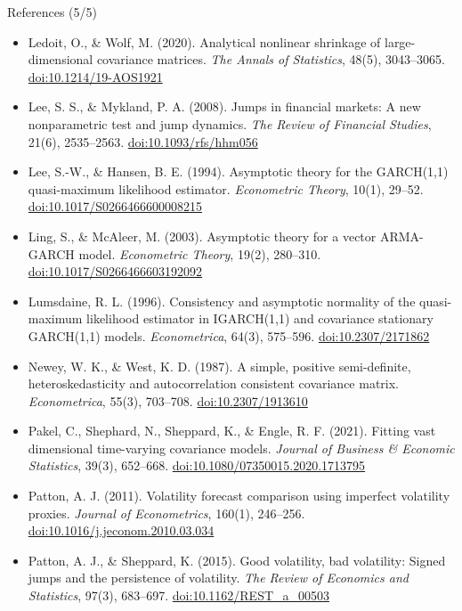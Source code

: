 \begin{frame}{References (5/5)}
\itemsize{\tiny}
\begin{itemize}
    \item Ledoit, O., \& Wolf, M. (2020). Analytical nonlinear shrinkage of large-dimensional covariance matrices. \textit{The Annals of Statistics}, 48(5), 3043--3065. \href{https://doi.org/10.1214/19-AOS1921}{doi:10.1214/19-AOS1921}
    \item Lee, S. S., \& Mykland, P. A. (2008). Jumps in financial markets: A new nonparametric test and jump dynamics. \textit{The Review of Financial Studies}, 21(6), 2535--2563. \href{https://doi.org/10.1093/rfs/hhm056}{doi:10.1093/rfs/hhm056}
    \item Lee, S.-W., \& Hansen, B. E. (1994). Asymptotic theory for the GARCH(1,1) quasi-maximum likelihood estimator. \textit{Econometric Theory}, 10(1), 29--52. \href{https://doi.org/10.1017/S0266466600008215}{doi:10.1017/S0266466600008215}
    \item Ling, S., \& McAleer, M. (2003). Asymptotic theory for a vector ARMA-GARCH model. \textit{Econometric Theory}, 19(2), 280--310. \href{https://doi.org/10.1017/S0266466603192092}{doi:10.1017/S0266466603192092}
    \item Lumsdaine, R. L. (1996). Consistency and asymptotic normality of the quasi-maximum likelihood estimator in IGARCH(1,1) and covariance stationary GARCH(1,1) models. \textit{Econometrica}, 64(3), 575--596. \href{https://doi.org/10.2307/2171862}{doi:10.2307/2171862}
    \item Newey, W. K., \& West, K. D. (1987). A simple, positive semi-definite, heteroskedasticity and autocorrelation consistent covariance matrix. \textit{Econometrica}, 55(3), 703--708. \href{https://doi.org/10.2307/1913610}{doi:10.2307/1913610}
    \item Pakel, C., Shephard, N., Sheppard, K., \& Engle, R. F. (2021). Fitting vast dimensional time-varying covariance models. \textit{Journal of Business \& Economic Statistics}, 39(3), 652--668. \href{https://doi.org/10.1080/07350015.2020.1713795}{doi:10.1080/07350015.2020.1713795}
    \item Patton, A. J. (2011). Volatility forecast comparison using imperfect volatility proxies. \textit{Journal of Econometrics}, 160(1), 246--256. \href{https://doi.org/10.1016/j.jeconom.2010.03.034}{doi:10.1016/j.jeconom.2010.03.034}
    \item Patton, A. J., \& Sheppard, K. (2015). Good volatility, bad volatility: Signed jumps and the persistence of volatility. \textit{The Review of Economics and Statistics}, 97(3), 683--697. \href{https://doi.org/10.1162/REST_a_00503}{doi:10.1162/REST\_a\_00503}

\end{itemize}
\end{frame}
